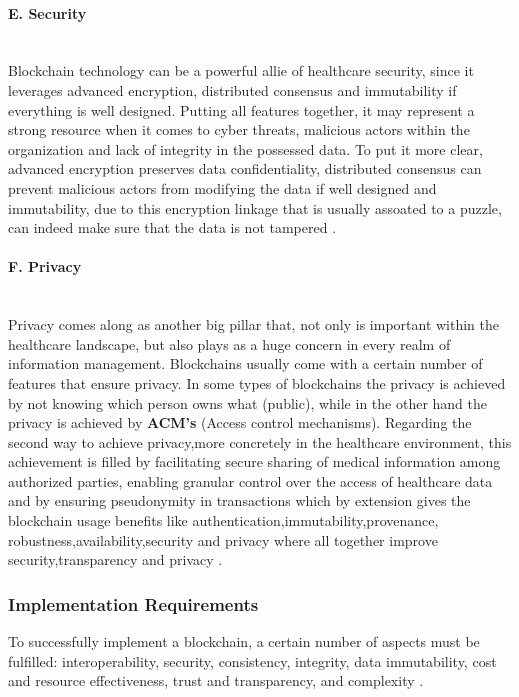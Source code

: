 \paragraph{E. Security} \mbox{}\\
Blockchain technology can be a powerful allie of healthcare security, since it leverages advanced
encryption, distributed consensus and immutability if everything is well 
designed. Putting all features together, it may represent a strong resource when it comes to 
cyber threats, malicious actors within the organization and lack of integrity in the possessed data. 
To put it more clear, advanced encryption preserves data confidentiality, 
distributed consensus can prevent malicious actors from modifying the data if well designed 
and immutability, due to this encryption linkage that is usually assoated to a puzzle, can 
indeed make sure that the data is not tampered \cite{encryption-algorithms}.

\paragraph{F. Privacy} \mbox{}\\
Privacy comes along as another big pillar that, not only is important within the 
healthcare landscape, but also plays as a huge concern in every realm of information 
management. Blockchains usually come with a certain number of features that ensure privacy. 
In some types of blockchains the privacy is achieved by not knowing which person owns what (public), 
while in the other hand the privacy is achieved by \textbf{ACM's} (Access control mechanisms). Regarding 
the second way to achieve privacy,more concretely in the healthcare environment, this achievement is filled 
by facilitating secure sharing of medical information among authorized parties, enabling 
granular control over the access of healthcare data and by ensuring pseudonymity in transactions 
which by extension gives the blockchain usage benefits like authentication,immutability,provenance,
robustness,availability,security and privacy where all together improve security,transparency and privacy \cite{privacy-healthcare}.

\subsubsection{Implementation Requirements} 
To successfully implement a blockchain, a certain number of aspects must be fulfilled: interoperability, 
security, consistency, integrity, data immutability, cost and resource effectiveness, trust and transparency, 
and complexity \cite{blockchain-utilization-in-healthcare}.

